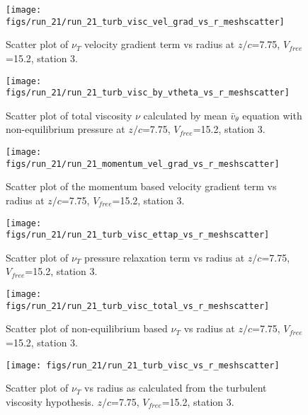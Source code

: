 \begin{figure}[H]
\centering
\texttt{[image: figs/run\_21/run\_21\_turb\_visc\_vel\_grad\_vs\_r\_meshscatter]}
\caption{Scatter plot of $\nu_T$ velocity gradient term vs radius at $z/c$=7.75, $V_{free}$=15.2, station 3.}
\end{figure}


\begin{figure}[H]
\centering
\texttt{[image: figs/run\_21/run\_21\_turb\_visc\_by\_vtheta\_vs\_r\_meshscatter]}
\caption{Scatter plot of total viscosity $\nu$ calculated by mean $\bar{v}_{\theta}$ equation with non-equilibrium pressure at $z/c$=7.75, $V_{free}$=15.2, station 3.}
\end{figure}


\begin{figure}[H]
\centering
\texttt{[image: figs/run\_21/run\_21\_momentum\_vel\_grad\_vs\_r\_meshscatter]}
\caption{Scatter plot of the momentum based velocity gradient term vs radius at $z/c$=7.75, $V_{free}$=15.2, station 3.}
\end{figure}


\begin{figure}[H]
\centering
\texttt{[image: figs/run\_21/run\_21\_turb\_visc\_ettap\_vs\_r\_meshscatter]}
\caption{Scatter plot of $\nu_T$ pressure relaxation term vs radius at $z/c$=7.75, $V_{free}$=15.2, station 3.}
\end{figure}


\begin{figure}[H]
\centering
\texttt{[image: figs/run\_21/run\_21\_turb\_visc\_total\_vs\_r\_meshscatter]}
\caption{Scatter plot of non-equilibrium based $\nu_T$ vs radius at $z/c$=7.75, $V_{free}$=15.2, station 3.}
\end{figure}


\begin{figure}[H]
\centering
\texttt{[image: figs/run\_21/run\_21\_turb\_visc\_vs\_r\_meshscatter]}
\caption{Scatter plot of $\nu_T$ vs radius as calculated from the turbulent viscosity hypothesis. $z/c$=7.75, $V_{free}$=15.2, station 3.}
\end{figure}


